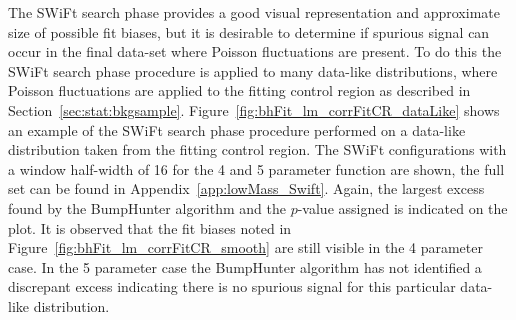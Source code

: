 The SWiFt search phase provides a good visual representation and approximate size of possible fit biases,
but it is desirable to determine if spurious signal can occur in the final data-set where Poisson fluctuations are present.
To do this the SWiFt search phase procedure is applied to many data-like distributions,
where Poisson fluctuations are applied to the fitting control region as described in Section~\ref{sec:stat:bkgsample}.
Figure~\ref{fig:bhFit_lm_corrFitCR_dataLike} shows an example of the SWiFt search phase procedure performed on a data-like distribution taken from the fitting control region.
The SWiFt configurations with a window half-width of 16 for the 4 and 5 parameter function are shown, the full set can be found in Appendix~\ref{app:lowMass_Swift}.
Again, the largest excess found by the {\sc BumpHunter} algorithm and the \mbox{$p$-value} assigned is indicated on the plot.
It is observed that the fit biases noted in Figure~\ref{fig:bhFit_lm_corrFitCR_smooth} are still visible in the 4 parameter case.
In the 5 parameter case the {\sc BumpHunter} algorithm has not identified a discrepant excess indicating
there is no spurious signal for this particular data-like distribution.

